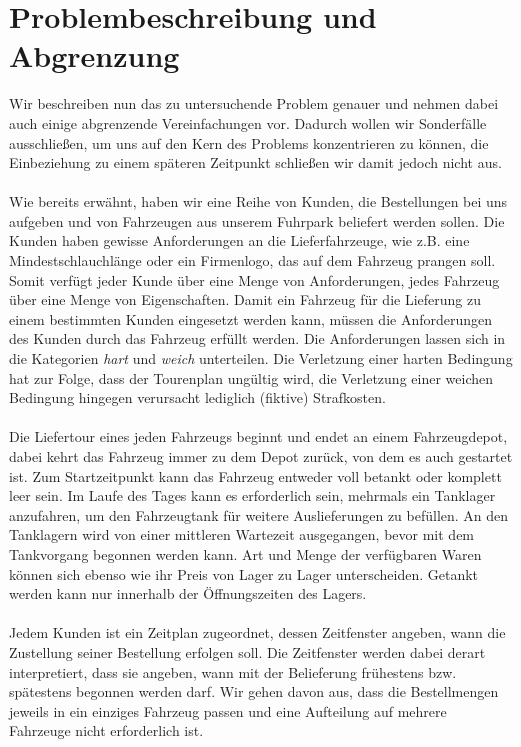 \section{Problembeschreibung und Abgrenzung}
Wir beschreiben nun das zu untersuchende Problem genauer und nehmen dabei auch einige abgrenzende Vereinfachungen vor. Dadurch wollen wir Sonderfälle ausschließen, um uns auf den Kern des Problems konzentrieren zu können, die Einbeziehung zu einem späteren Zeitpunkt schließen wir damit jedoch nicht aus. \\
\\
Wie bereits erwähnt, haben wir eine Reihe von Kunden, die Bestellungen bei uns aufgeben und von Fahrzeugen aus unserem Fuhrpark beliefert werden sollen. Die Kunden haben gewisse Anforderungen an die Lieferfahrzeuge, wie z.B. eine Mindestschlauchlänge oder ein Firmenlogo, das auf dem Fahrzeug prangen soll. Somit verfügt jeder Kunde über eine Menge von Anforderungen, jedes Fahrzeug über eine Menge von Eigenschaften. Damit ein Fahrzeug für die Lieferung zu einem bestimmten Kunden eingesetzt werden kann, müssen die Anforderungen des Kunden durch das Fahrzeug erfüllt werden. Die Anforderungen lassen sich in die Kategorien \emph{hart} und \emph{weich} unterteilen. Die Verletzung einer harten Bedingung hat zur Folge, dass der Tourenplan ungültig wird, die Verletzung einer weichen Bedingung hingegen verursacht lediglich (fiktive) Strafkosten. \\
\\
Die Liefertour eines jeden Fahrzeugs beginnt und endet an einem Fahrzeugdepot, dabei kehrt das Fahrzeug immer zu dem Depot zurück, von dem es auch gestartet ist. Zum Startzeitpunkt kann das Fahrzeug entweder voll betankt oder komplett leer sein. Im Laufe des Tages kann es erforderlich sein, mehrmals ein Tanklager anzufahren, um den Fahrzeugtank für weitere Auslieferungen zu befüllen. An den Tanklagern wird von einer mittleren Wartezeit ausgegangen, bevor mit dem Tankvorgang begonnen werden kann. Art und Menge der verfügbaren Waren können sich ebenso wie ihr Preis von Lager zu Lager unterscheiden. Getankt werden kann nur innerhalb der Öffnungszeiten des Lagers. \\
\\
Jedem Kunden ist ein Zeitplan zugeordnet, dessen Zeitfenster angeben, wann die Zustellung seiner Bestellung erfolgen soll. Die Zeitfenster werden dabei derart interpretiert, dass sie angeben, wann mit der Belieferung frühestens bzw. spätestens begonnen werden darf. Wir gehen davon aus, dass die Bestellmengen jeweils in ein einziges Fahrzeug passen und eine Aufteilung auf mehrere Fahrzeuge nicht erforderlich ist. \\
